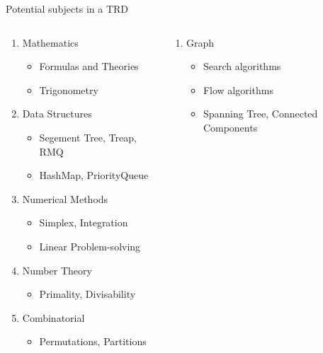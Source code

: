 \documentclass[11pt,pdf, aspectratio=169]{beamer}
\begin{document}
  \begin{frame}{Potential subjects in a TRD}
    \begin{columns}
      \begin{column}{.45\textwidth}
        \begin{enumerate}
          \item Mathematics
          \begin{itemize}
            \item Formulas and Theories
            \item Trigonometry
          \end{itemize}
          \item Data Structures
          \begin{itemize}
            \item Segement Tree, Treap, RMQ
            \item HashMap, PriorityQueue
          \end{itemize}
          \item Numerical Methods
          \begin{itemize}
            \item Simplex, Integration
            \item Linear Problem-solving
          \end{itemize}
          \item Number Theory
          \begin{itemize}
            \item Primality, Divisability
          \end{itemize}
          \item Combinatorial
          \begin{itemize}
            \item Permutations, Partitions
          \end{itemize}
        \end{enumerate}
      \end{column}
      \begin{column}{.45\textwidth}
        \begin{enumerate}
          \addtocounter{enumi}{5}
          \item Graph
          \begin{itemize}
            \item Search algorithms
            \item Flow algorithms
            \item Spanning Tree, Connected Components

\end{itemize}
\end{enumerate}
\end{column}
\end{columns}
\end{frame}
\end{document}
